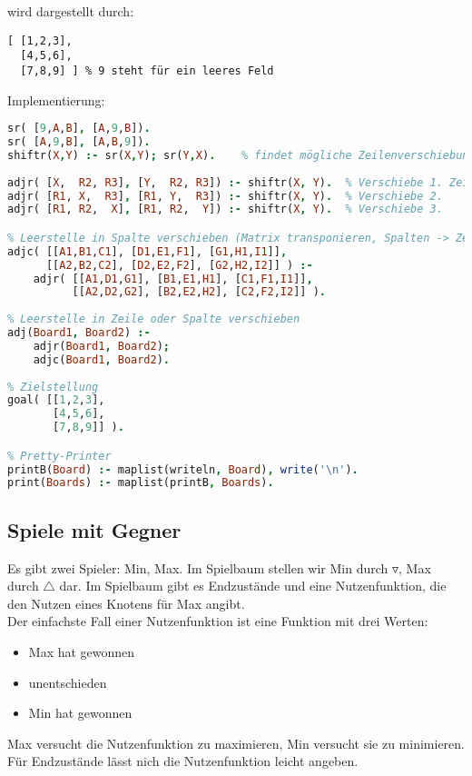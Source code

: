 wird dargestellt durch:
\begin{lstlisting}
[ [1,2,3], 
  [4,5,6], 
  [7,8,9] ]	% 9 steht für ein leeres Feld
\end{lstlisting}
Implementierung:
\begin{lstlisting}[language=Prolog]
% Leerstelle in Zeile verschieben
sr( [9,A,B], [A,9,B]).
sr( [A,9,B], [A,B,9]).
shiftr(X,Y) :- sr(X,Y); sr(Y,X).	% findet mögliche Zeilenverschiebungen.
 
adjr( [X,  R2, R3], [Y,  R2, R3]) :- shiftr(X, Y).	% Verschiebe 1. Zeile, wenn sie Leerstelle enthält.
adjr( [R1, X,  R3], [R1, Y,  R3]) :- shiftr(X, Y).	% Verschiebe 2.
adjr( [R1, R2,  X], [R1, R2,  Y]) :- shiftr(X, Y).	% Verschiebe 3.

% Leerstelle in Spalte verschieben (Matrix transponieren, Spalten -> Zeilen. Damit Zeilenverschiebung durchführen)
adjc( [[A1,B1,C1], [D1,E1,F1], [G1,H1,I1]], 
      [[A2,B2,C2], [D2,E2,F2], [G2,H2,I2]] ) :-
	adjr( [[A1,D1,G1], [B1,E1,H1], [C1,F1,I1]],
	      [[A2,D2,G2], [B2,E2,H2], [C2,F2,I2]] ).  
 
% Leerstelle in Zeile oder Spalte verschieben
adj(Board1, Board2) :-
	adjr(Board1, Board2);
	adjc(Board1, Board2).
	
% Zielstellung
goal( [[1,2,3],
       [4,5,6],
       [7,8,9]] ).

% Pretty-Printer
printB(Board) :- maplist(writeln, Board), write('\n').
print(Boards) :- maplist(printB, Boards).
\end{lstlisting}

\subsection{Spiele mit Gegner}

Es gibt zwei Spieler: Min, Max. Im Spielbaum stellen wir Min durch $\triangledown$, Max durch $\triangle$ dar. Im Spielbaum gibt es Endzustände und eine Nutzenfunktion, die den Nutzen eines Knotens für Max angibt.\\
Der einfachste Fall einer Nutzenfunktion ist eine Funktion mit drei Werten:
\begin{itemize}
\item[1:] Max hat gewonnen
\item[0:] unentschieden
\item[-1:] Min hat gewonnen
\end{itemize}
Max versucht die Nutzenfunktion zu maximieren, Min versucht sie zu minimieren.\\
Für Endzustände lässt nich die Nutzenfunktion leicht angeben.

